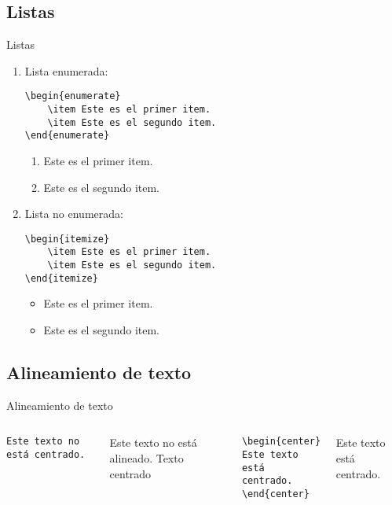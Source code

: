 \documentclass[../slides.tex]{subfiles}
\begin{document}
    \subsection{Listas}
    \begin{frame}[fragile]{Listas}
        \begin{enumerate}
            \item Lista enumerada:
                \begin{verbatim}
\begin{enumerate}
    \item Este es el primer item.
    \item Este es el segundo item.
\end{enumerate}
                \end{verbatim}
\begin{enumerate}
    \item Este es el primer item.
    \item Este es el segundo item.
\end{enumerate}
            \item Lista no enumerada:
                \begin{verbatim}
\begin{itemize}
    \item Este es el primer item.
    \item Este es el segundo item.
\end{itemize}
                \end{verbatim}
\begin{itemize}
    \item Este es el primer item.
    \item Este es el segundo item.
\end{itemize}
        \end{enumerate}
    \end{frame}
    
    \subsection{Alineamiento de texto}
    \begin{frame}[fragile]{Alineamiento de texto}
        \begin{columns}
                \begin{verbatim}
Este texto no está centrado.
                \end{verbatim}
Este texto no está alineado.
                Texto centrado
                    \begin{verbatim}
\begin{center}
Este texto está centrado.
\end{center}
                    \end{verbatim}
\begin{center}
Este texto está centrado.
\end{center}
        \end{columns}
    \end{frame}
\end{document}
